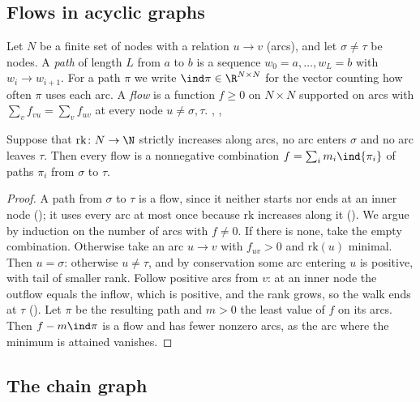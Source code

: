 \subsection{Flows in acyclic graphs}

Let $N$ be a finite set of nodes with a relation $u\to v$ (arcs), and let $\sigma\ne\tau$ be nodes. A \emph{path} of length $L$ from $a$ to $b$ is a sequence $w_0=a,\dots,w_L=b$ with $w_i\to w_{i+1}$. For a path $\pi$ we write $\ind\pi\in\R^{N\times N}$ for the vector counting how often $\pi$ uses each arc. A \emph{flow} is a function $f\ge0$ on $N\times N$ supported on arcs with $\sum_vf_{vu}=\sum_vf_{uv}$ at every node $u\ne\sigma,\tau$. \hfill{}, , 

\begin{lemma}\label{lem:decomp}
Suppose that $\mathrm{rk}\colon N\to\N$ strictly increases along arcs, no arc enters $\sigma$ and no arc leaves $\tau$. Then every flow is a nonnegative combination $f=\sum_im_i\ind{\pi_i}$ of paths $\pi_i$ from $\sigma$ to $\tau$. \hfill{}
\end{lemma}

\begin{proof}
A path from $\sigma$ to $\tau$ is a flow, since it neither starts nor ends at an inner node (); it uses every arc at most once because $\mathrm{rk}$ increases along it (). We argue by induction on the number of arcs with $f\neq0$. If there is none, take the empty combination. Otherwise take an arc $u\to v$ with $f_{uv}>0$ and $\mathrm{rk}(u)$ minimal. Then $u=\sigma$: otherwise $u\ne\tau$, and by conservation some arc entering $u$ is positive, with tail of smaller rank. Follow positive arcs from $v$: at an inner node the outflow equals the inflow, which is positive, and the rank grows, so the walk ends at $\tau$ (). Let $\pi$ be the resulting path and $m>0$ the least value of $f$ on its arcs. Then $f-m\ind\pi$ is a flow and has fewer nonzero arcs, as the arc where the minimum is attained vanishes.
\end{proof}

\subsection{The chain graph}

